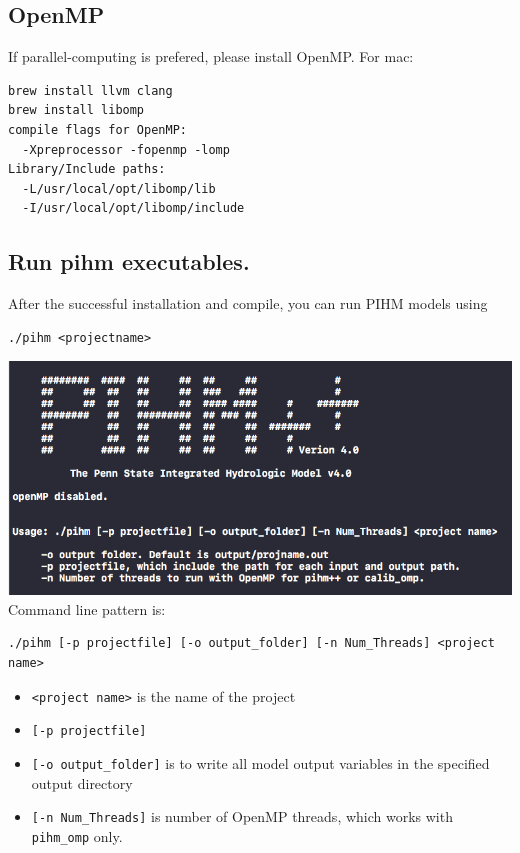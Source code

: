 \documentclass[]{scrbook}
\providecommand{\tightlist}{%
  \setlength{\itemsep}{0pt}\setlength{\parskip}{0pt}}
\begin{document}
\subsection{OpenMP}\label{openmp}

If parallel-computing is prefered, please install OpenMP. For mac:

\begin{verbatim}
brew install llvm clang
brew install libomp
compile flags for OpenMP: 
  -Xpreprocessor -fopenmp -lomp
Library/Include paths:
  -L/usr/local/opt/libomp/lib 
  -I/usr/local/opt/libomp/include
\end{verbatim}

\subsection{Run pihm executables.}\label{run-pihm-executables.}

After the successful installation and compile, you can run PIHM models
using

\begin{verbatim}
./pihm <projectname>
\end{verbatim}

\includegraphics{Fig/CLI.png} Command line pattern is:

\begin{verbatim}
./pihm [-p projectfile] [-o output_folder] [-n Num_Threads] <project name> 
\end{verbatim}

\begin{itemize}
\tightlist
\item
  \texttt{\textless{}project\ name\textgreater{}} is the name of the
  project
\item
  \texttt{{[}-p\ projectfile{]}}
\item
  \texttt{{[}-o\ output\_folder{]}} is to write all model output
  variables in the specified output directory
\item
  \texttt{{[}-n\ Num\_Threads{]}} is number of OpenMP threads, which
  works with \texttt{pihm\_omp} only.
\end{itemize}
\end{document}
